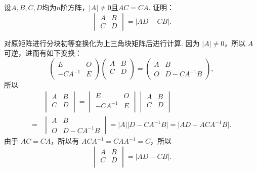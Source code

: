 \begin{exercise}
\begin{exgroup}
        \item 设$A,B,C,D$均为$n$阶方阵，$\lvert A \rvert \neq 0$且$AC=CA$. 证明：
        \[\begin{vmatrix}
                A & B \\ C & D
            \end{vmatrix} = |AD-CB|.\]
        \begin{answer}
            对原矩阵进行分块初等变换化为上三角块矩阵后进行计算. 因为 $\lvert A \rvert \neq 0$，所以 $A$ 可逆，进而有如下变换：
            \[\begin{pmatrix}
                    E        & O \\
                    -CA^{-1} & E
                \end{pmatrix} \begin{pmatrix}
                    A & B \\
                    C & D \\
                \end{pmatrix} = \begin{pmatrix}
                    A & B          \\
                    O & D-CA^{-1}B
                \end{pmatrix},\]
            所以
            \begin{align*}
                    & \begin{vmatrix}
                            A & B \\
                            C & D \\
                        \end{vmatrix}
                = \begin{vmatrix}
                        E        & O \\
                        -CA^{-1} & E \\
                    \end{vmatrix}
                \begin{vmatrix}
                    A & B \\
                    C & D \\
                \end{vmatrix}       \\
                ={} & \begin{vmatrix}
                            A & B          \\
                            O & D-CA^{-1}B
                        \end{vmatrix}
                = \lvert A \rvert \lvert D-CA^{-1}B \rvert = \lvert AD-ACA^{-1}B \rvert.
            \end{align*} 由于 $AC = CA$，所以有 $ACA^{-1} = CAA^{-1} = C$，所以
            \[\begin{vmatrix}
                    A & B \\
                    C & D \\
                \end{vmatrix} = \lvert AD-CB \rvert.\]
        \end{answer}


\end{exgroup}
\end{exercise}
